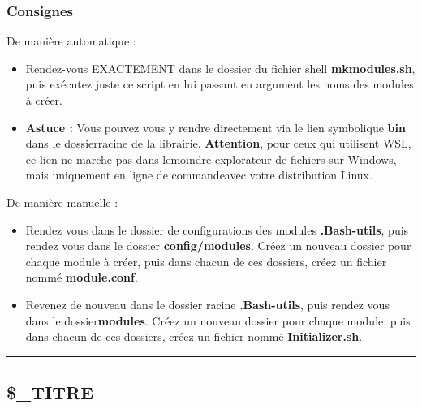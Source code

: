 \documentclass[a4paper,10pt]{article}
\begin{document}
\subsubsection{Consignes}\color{white}
De manière automatique :
\begin{itemize}
    \item Rendez-vous EXACTEMENT dans le dossier du fichier shell \textbf{\color{lime}mkmodules.sh}, puis exécutez juste ce script en lui passant en argument les noms des modules à créer.\\[1\baselineskip]
    
    \item \textbf{Astuce :} Vous pouvez vous y rendre directement via le lien symbolique \textbf{\color{lime}bin} dans le dossier\linebreak racine de la librairie. \textbf{Attention}, pour ceux qui utilisent WSL, ce lien ne marche pas dans le\linebreak moindre explorateur de fichiers sur Windows, mais uniquement en ligne de commande\linebreak avec votre distribution Linux.\\[1\baselineskip]
\end{itemize}

De manière manuelle :
\begin{itemize}
    \item  Rendez vous dans le dossier de configurations des modules \textbf{\color{lime}.Bash-utils}, puis rendez vous dans le dossier \textbf{\color{lime}config/modules}. Créez un nouveau dossier pour chaque module à créer, puis dans chacun de ces dossiers, créez un fichier nommé \textbf{\color{lime}module.conf}.\\[1\baselineskip]

    \item Revenez de nouveau dans le dossier racine \textbf{\color{lime}.Bash-utils}, puis rendez vous dans le dossier\linebreak \textbf{\color{lime}modules}. Créez un nouveau dossier pour chaque module, puis dans chacun de ces dossiers, créez un fichier nommé \textbf{\color{lime}Initializer.sh}.
\end{itemize}


\color{green}\par\noindent\rule{\textwidth}{0.4pt}\color{white}

\color{green}
\subsection{\$\_TITRE}\color{white}
\end{document}
